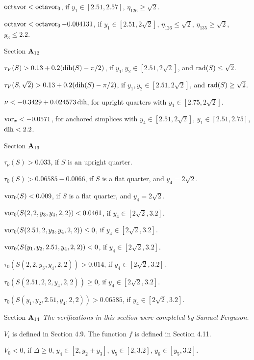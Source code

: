  $\operatorname{octavor} < \operatorname{octavor}_0$,
	if $y_1\in[2.51,2.57]$,
	$\eta_{126}\ge\sqrt2$.

 $\operatorname{octavor}<\operatorname{octavor}_0 - 0.004131$,
	if $y_1\in[2.51,2\sqrt{2}]$,
	$\eta_{126}\le\sqrt2$,
	$\eta_{135}\ge\sqrt2$,
	$y_3\le2.2$.

\subhead Section ${\bold A}_{12}$\endsubhead

 $\tau_V(S) > 0.13 + 0.2 (\operatorname{dih}(S)-\pi/2)$,
	if $y_1,y_2\in[2.51,2\sqrt{2}]$, and $\operatorname{rad}(S)\le\sqrt{2}$.

 $\tau_V(S,\sqrt{2}) > 0.13 + 0.2 (\operatorname{dih}(S)-\pi/2)$,
	if $y_1,y_2\in[2.51,2\sqrt{2}]$, and $\operatorname{rad}(S)\ge\sqrt{2}$.

 $\nu < -0.3429 + 0.024573\operatorname{dih}$, for upright quarters with
	$y_1\in[2.75,2\sqrt{2}]$.

 $\operatorname{vor}_x < -0.0571$, for anchored simplices with
	$y_4\in[2.51,2\sqrt2]$, $y_1\in[2.51,2.75]$, $\operatorname{dih}<2.2$.

\subhead Section ${\bold A}_{13}$\endsubhead

$\tau_\nu(S)>0.033$, if $S$ is an upright quarter.

$\tau_0(S) > 0.06585- 0.0066$, 
	if $S$ is a flat quarter, and $y_4=2\sqrt{2}$.

$\operatorname{vor}_0(S) < 0.009$, if $S$ is a flat quarter, and $y_4=2\sqrt{2}$.

$\operatorname{vor}_0(S(2,2,y_3,y_4,2,2))<0.0461$, if $y_4\in[2\sqrt{2},3.2]$.

$\operatorname{vor}_0(S(2.51,2,y_3,y_4,2,2))\le0$, if $y_4\in[2\sqrt{2},3.2]$.

$\operatorname{vor}_0(S(y_1,y_2,2.51,y_4,2,2))<0$, if $y_4\in[2\sqrt{2},3.2]$.

$\tau_0(S(2,2,y_3,y_4,2,2))>0.014$,  if $y_4\in[2\sqrt{2},3.2]$.

$\tau_0(S(2.51,2,2,y_4,2,2))\ge0$,  if $y_4\in[2\sqrt{2},3.2]$.

$\tau_0(S(y_1,y_2,2.51,y_4,2,2))>0.06585$, if $y_4\in[2\sqrt{2},3.2]$.

\subhead Section ${\bold A}_{14}$\endsubhead
{\it The verifications in this section were completed by Samuel Ferguson.}

$V_i$ is defined in Section 4.9. The function $f$ is defined
in Section 4.11.

$V_0 < 0$, 
if $\Delta\ge0$, $y_4\in[2,y_2+y_3]$, $y_5\in[2,3.2]$,
		$y_6\in[y_5,3.2]$.

